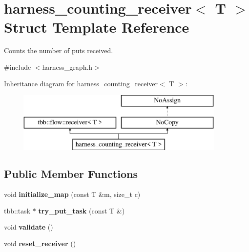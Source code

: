 \hypertarget{structharness__counting__receiver}{}\section{harness\+\_\+counting\+\_\+receiver$<$ T $>$ Struct Template Reference}
\label{structharness__counting__receiver}


Counts the number of puts received.  




{\ttfamily \#include $<$harness\+\_\+graph.\+h$>$}

Inheritance diagram for harness\+\_\+counting\+\_\+receiver$<$ T $>$\+:\begin{figure}[H]
\begin{center}
\leavevmode
\includegraphics[height=3.000000cm]{structharness__counting__receiver}
\end{center}
\end{figure}
\subsection*{Public Member Functions}
\begin{DoxyCompactItemize}
\item 
\hypertarget{structharness__counting__receiver_a4b4445d7ebd58afa2c1137fcd3e9956c}{}void {\bfseries initialize\+\_\+map} (const T \&m, size\+\_\+t c)\label{structharness__counting__receiver_a4b4445d7ebd58afa2c1137fcd3e9956c}

\item 
\hypertarget{structharness__counting__receiver_ad112fc669a5c2418d5410c49997c8d3d}{}tbb\+::task $\ast$ {\bfseries try\+\_\+put\+\_\+task} (const T \&)\label{structharness__counting__receiver_ad112fc669a5c2418d5410c49997c8d3d}

\item 
\hypertarget{structharness__counting__receiver_a1bc999345ca09e3e5bce023a3a2d325e}{}void {\bfseries validate} ()\label{structharness__counting__receiver_a1bc999345ca09e3e5bce023a3a2d325e}

\item 
\hypertarget{structharness__counting__receiver_a59abbcccea132b6a01d657d37fa95470}{}void {\bfseries reset\+\_\+receiver} ()\label{structharness__counting__receiver_a59abbcccea132b6a01d657d37fa95470}

\end{DoxyCompactItemize}
